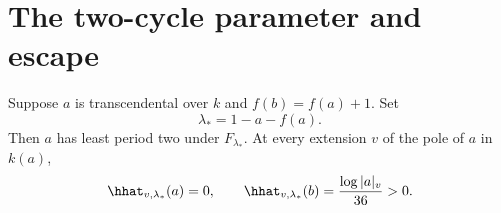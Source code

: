 \section{The two-cycle parameter and escape}\label{sec:witness}

\begin{lemma}\label{lem:witness}
Suppose $a$ is transcendental over $k$ and $f(b)=f(a)+1$. Set
\begin{equation}\label{eq:parameter}
 \lambda_*=1-a-f(a).
\end{equation}
Then $a$ has least period two under $F_{\lambda_*}$. At every
extension $v$ of the pole of $a$ in $k(a)$,
\begin{equation}\label{eq:separation}
 \hhat_{v,\lambda_*}(a)=0,\qquad
 \hhat_{v,\lambda_*}(b)=\frac{\log|a|_v}{36}>0 .
\end{equation}
\end{lemma}

